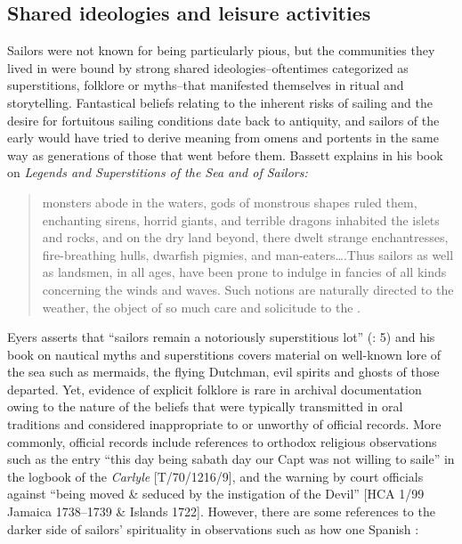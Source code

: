 \subsection{{Shared ideologies and leisure activities}}\label{sec:4.2.6}

Sailors were not known for being particularly pious, but the communities they lived in were bound by strong shared ideologies–oftentimes categorized as superstitions, folklore or myths–that manifested themselves in ritual and storytelling. Fantastical beliefs relating to the inherent risks of sailing and the desire for fortuitous sailing conditions date back to antiquity, and sailors of the early  would have tried to derive meaning from omens and portents in the same way as generations of those that went before them. Bassett explains in his book on \textit{Legends and Superstitions of the Sea and of Sailors:}

\begin{quotation}
monsters abode in the waters, gods of monstrous shapes ruled them, enchanting sirens, horrid giants, and terrible dragons inhabited the islets and rocks, and on the dry land beyond, there dwelt strange enchantresses, fire-breathing hulls, dwarfish pigmies, and man-eaters….Thus sailors as well as landsmen, in all ages, have been prone to indulge in fancies of all kinds concerning the winds and waves. Such notions are naturally directed to the weather, the object of so much care and solicitude to the . \citep[12]{Bassett1885}
\end{quotation}

Eyers asserts that “sailors remain a notoriously superstitious lot” (\citealt{Eyers2011}: 5) and his book on nautical myths and superstitions covers material on well-known lore of the sea such as mermaids, the flying Dutchman, evil spirits and ghosts of those departed. Yet, evidence of explicit folklore is rare in archival documentation owing to the nature of the beliefs that were typically transmitted in oral traditions and considered inappropriate to or unworthy of official records. More commonly, official records include references to orthodox religious observations such as the entry “this day being sabath day our Capt was not willing to saile” in the logbook of the \textit{Carlyle} [T/70/1216/9], and the warning by court officials against “being moved \& seduced by the instigation of the Devil” [HCA 1/99 Jamaica {1738}–1739 \&  Islands 1722]. However, there are some references to the darker side of sailors’ spirituality in observations such as how one Spanish : 


